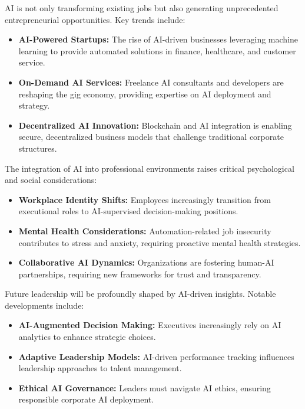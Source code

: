 \documentclass[a4paper,headinclude=on,footinclude=on,12pt,oneside]{scrbook}
\begin{document}
AI is not only transforming existing jobs but also generating unprecedented entrepreneurial opportunities. Key trends include:
\begin{itemize}
	\item \textbf{AI-Powered Startups:} The rise of AI-driven businesses leveraging machine learning to provide automated solutions in finance, healthcare, and customer service.
	\item \textbf{On-Demand AI Services:} Freelance AI consultants and developers are reshaping the gig economy, providing expertise on AI deployment and strategy.
	\item \textbf{Decentralized AI Innovation:} Blockchain and AI integration is enabling secure, decentralized business models that challenge traditional corporate structures.
\end{itemize}


The integration of AI into professional environments raises critical psychological and social considerations:
\begin{itemize}
	\item \textbf{Workplace Identity Shifts:} Employees increasingly transition from executional roles to AI-supervised decision-making positions.
	\item \textbf{Mental Health Considerations:} Automation-related job insecurity contributes to stress and anxiety, requiring proactive mental health strategies.
	\item \textbf{Collaborative AI Dynamics:} Organizations are fostering human-AI partnerships, requiring new frameworks for trust and transparency.
\end{itemize}


Future leadership will be profoundly shaped by AI-driven insights. Notable developments include:
\begin{itemize}
	\item \textbf{AI-Augmented Decision Making:} Executives increasingly rely on AI analytics to enhance strategic choices.
	\item \textbf{Adaptive Leadership Models:} AI-driven performance tracking influences leadership approaches to talent management.
	\item \textbf{Ethical AI Governance:} Leaders must navigate AI ethics, ensuring responsible corporate AI deployment.
\end{itemize}
\end{document}

